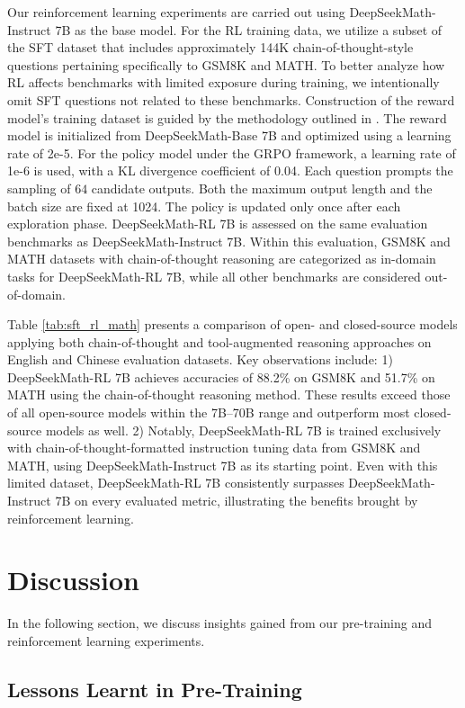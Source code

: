 \begin{itemize}[topsep=0pt]
Our reinforcement learning experiments are carried out using DeepSeekMath-Instruct 7B as the base model. For the RL training data, we utilize a subset of the SFT dataset that includes approximately 144K chain-of-thought-style questions pertaining specifically to GSM8K and MATH. To better analyze how RL affects benchmarks with limited exposure during training, we intentionally omit SFT questions not related to these benchmarks. Construction of the reward model’s training dataset is guided by the methodology outlined in \citep{wang2023math}. The reward model is initialized from DeepSeekMath-Base 7B and optimized using a learning rate of 2e-5. For the policy model under the GRPO framework, a learning rate of 1e-6 is used, with a KL divergence coefficient of 0.04. Each question prompts the sampling of $64$ candidate outputs. Both the maximum output length and the batch size are fixed at 1024. The policy is updated only once after each exploration phase. DeepSeekMath-RL 7B is assessed on the same evaluation benchmarks as DeepSeekMath-Instruct 7B. Within this evaluation, GSM8K and MATH datasets with chain-of-thought reasoning are categorized as in-domain tasks for DeepSeekMath-RL 7B, while all other benchmarks are considered out-of-domain.

Table \ref{tab:sft_rl_math} presents a comparison of open- and closed-source models applying both chain-of-thought and tool-augmented reasoning approaches on English and Chinese evaluation datasets. Key observations include: 1) DeepSeekMath-RL 7B achieves accuracies of 88.2\% on GSM8K and 51.7\% on MATH using the chain-of-thought reasoning method. These results exceed those of all open-source models within the 7B–70B range and outperform most closed-source models as well. 2) Notably, DeepSeekMath-RL 7B is trained exclusively with chain-of-thought-formatted instruction tuning data from GSM8K and MATH, using DeepSeekMath-Instruct 7B as its starting point. Even with this limited dataset, DeepSeekMath-RL 7B consistently surpasses DeepSeekMath-Instruct 7B on every evaluated metric, illustrating the benefits brought by reinforcement learning.

\section{Discussion}
In the following section, we discuss insights gained from our pre-training and reinforcement learning experiments.

\subsection{Lessons Learnt in Pre-Training}


\end{itemize}
